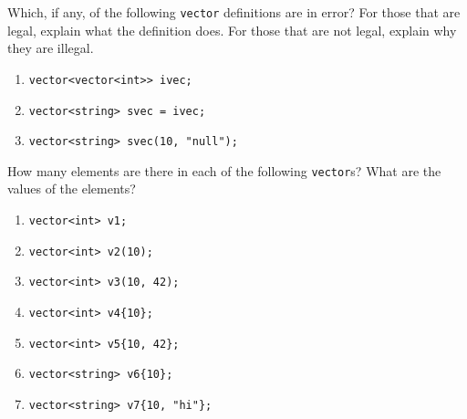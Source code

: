 %
%
\begin{question}
Which, if any, of the following \verb|vector| definitions are in
error? For those that are legal, explain what the definition does. For those
that are not legal, explain why they are illegal.
\begin{enumerate}[label=(\alph*)]
^^I\item \verb|vector<vector<int>> ivec;|
^^I\item \verb|vector<string> svec = ivec;|
^^I\item \verb|vector<string> svec(10, "null");|
\end{enumerate}
\end{question}

\begin{question}\label{qst:vector elements}
How many elements are there in each of the following \verb|vector|s? What are the values of the elements?
\begin{enumerate}[label=(\alph*)]
^^I\item \verb|vector<int> v1;|
^^I\item \verb|vector<int> v2(10);|
^^I\item \verb|vector<int> v3(10, 42);|
^^I\item \verb|vector<int> v4{10};|
^^I\item \verb|vector<int> v5{10, 42};|
^^I\item \verb|vector<string> v6{10};|
^^I\item \verb|vector<string> v7{10, "hi"};|
\end{enumerate}
\end{question}
